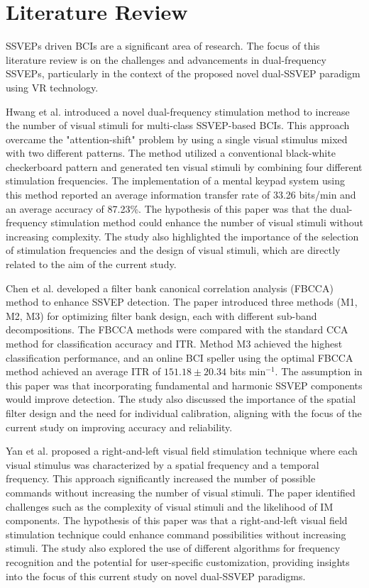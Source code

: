 \section{Literature Review}

SSVEPs driven BCIs are a significant area of research. The focus of this literature review is on the challenges and advancements in dual-frequency SSVEPs, particularly in the context of the proposed novel dual-SSVEP paradigm using VR technology.

Hwang et al. \cite{hwang2013new} introduced a novel dual-frequency stimulation method to increase the number of visual stimuli for multi-class SSVEP-based BCIs. This approach overcame the "attention-shift" problem by using a single visual stimulus mixed with two different patterns. The method utilized a conventional black-white checkerboard pattern and generated ten visual stimuli by combining four different stimulation frequencies. The implementation of a mental keypad system using this method reported an average information transfer rate of 33.26 bits/min and an average accuracy of 87.23\%. The hypothesis of this paper was that the dual-frequency stimulation method could enhance the number of visual stimuli without increasing complexity. The study also highlighted the importance of the selection of stimulation frequencies and the design of visual stimuli, which are directly related to the aim of the current study.

Chen et al. \cite{chen2015filter} developed a filter bank canonical correlation analysis (FBCCA) method to enhance SSVEP detection. The paper introduced three methods (M1, M2, M3) for optimizing filter bank design, each with different sub-band decompositions. The FBCCA methods were compared with the standard CCA method for classification accuracy and ITR. Method M3 achieved the highest classification performance, and an online BCI speller using the optimal FBCCA method achieved an average ITR of \(151.18 \pm 20.34\) bits min\(^{-1}\). The assumption in this paper was that incorporating fundamental and harmonic SSVEP components would improve detection. The study also discussed the importance of the spatial filter design and the need for individual calibration, aligning with the focus of the current study on improving accuracy and reliability.

Yan et al. \cite{yan2011right} proposed a right-and-left visual field stimulation technique where each visual stimulus was characterized by a spatial frequency and a temporal frequency. This approach significantly increased the number of possible commands without increasing the number of visual stimuli. The paper identified challenges such as the complexity of visual stimuli and the likelihood of IM components. The hypothesis of this paper was that a right-and-left visual field stimulation technique could enhance command possibilities without increasing stimuli. The study also explored the use of different algorithms for frequency recognition and the potential for user-specific customization, providing insights into the focus of this current study on novel dual-SSVEP paradigms.

